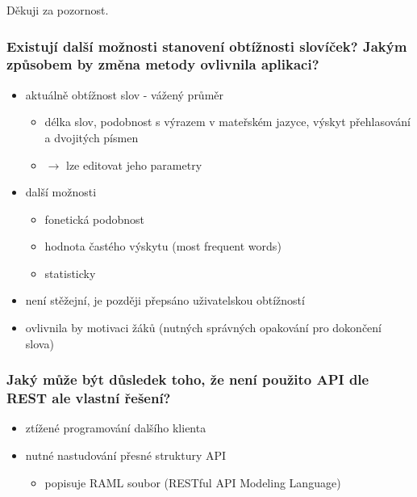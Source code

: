 \begin{frame}
\begin{center}
\label{lastslide}
\huge Děkuji za pozornost.
\end{center}
\end{frame}

\begin{frame}[noframenumbering]
    \frametitle{Existují další možnosti stanovení obtížnosti slovíček? Jakým způsobem by změna metody ovlivnila aplikaci?}

    \begin{itemize}
        \item aktuálně obtížnost slov - vážený průměr
        \begin{itemize}
            \item délka slov, podobnost s výrazem v mateřském jazyce, výskyt přehlasování a dvojitých písmen
            \item $\rightarrow$ lze editovat jeho parametry
        \end{itemize}
        \item další možnosti
        \begin{itemize}
            \item fonetická podobnost
            \item hodnota častého výskytu (most frequent words)
            \item statisticky
        \end{itemize}
        \item není stěžejní, je později přepsáno uživatelskou obtížností
        \item ovlivnila by motivaci žáků (nutných správných opakování pro dokončení slova)
    \end{itemize}
\end{frame}

\begin{frame}[noframenumbering]
    \frametitle{Jaký může být důsledek toho, že není použito API dle REST ale vlastní řešení?}
    \begin{itemize}
        \item ztížené programování dalšího klienta 
        \item nutné nastudování přesné struktury API 
        \begin{itemize}
            \item popisuje RAML soubor (RESTful API Modeling Language)
        \end{itemize}
    \end{itemize}
\end{frame}


